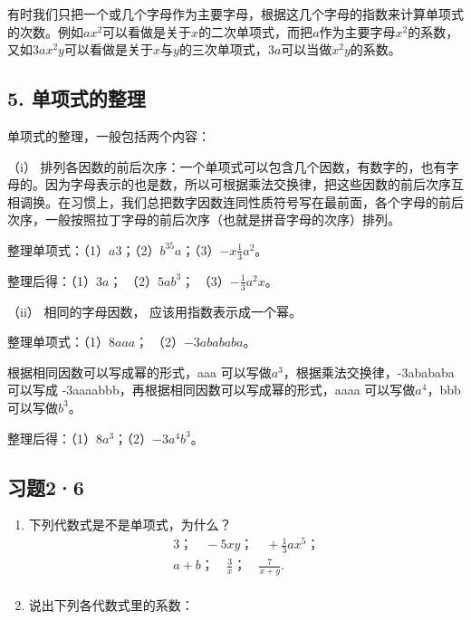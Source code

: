 
有时我们只把一个或几个字母作为主要字母，根据这几个字母的指数来计算单项式的次数。例如\(ax^2\)可以看做是关于\(x\)的二次单项式，而把\(a\)作为主要字母\(x^2\)的系数，又如\(3ax^2y\)可以看做是关于\(x\)与\(y\)的三次单项式，\(3a\)可以当做\(x^2y\)的系数。

\subsection{5. 单项式的整理}

单项式的整理，一般包括两个内容：

（i）
排列各因数的前后次序：一个单项式可以包含几个因数，有数字的，也有字母的。因为字母表示的也是数，所以可根据乘法交换律，把这些因数的前后次序互相调换。在习惯上，我们总把数字因数连同性质符号写在最前面，各个字母的前后次序，一般按照拉丁字母的前后次序（也就是拼音字母的次序）排列。

整理单项式：（1）\(a3\)；（2）\(b^35a\)；（3）\(-x\frac{1}{3} a^2\)。

 整理后得：（1）\(3a\)； （2）\(5ab^3\)；
（3）\(-\frac{1}{3} a^2 x\)。

（ii） 相同的字母因数， 应该用指数表示成一个幂。

 整理单项式：（1）\(8aaa\)； （2）\(-3abababa\)。

 根据相同因数可以写成幂的形式，aaa
可以写做\(a^{3}\)，根据乘法交换律，-3abababa 可以写成
-3aaaabbb，再根据相同因数可以写成幂的形式，aaaa 可以写做\(a^{4}\)，bbb
可以写做\(b^{3}\)。

 整理后得：（1）\(8a^{3}\)；（2）\(-3a^{4}b^{3}\)。

\subsection{习题2·6}

\begin{enumerate}
\item
  下列代数式是不是单项式，为什么？
\[
\begin{array}{l} 3\text{；} \quad - 5 x y\text{；} \quad + \frac{1}{3} a x ^{5}\text{；} \\ a + b\text{；} \quad \frac{3}{x}\text{；} \quad \frac{7}{x + y}. \\ \end{array}
\]
\item
  说出下列各代数式里的系数：
\end{enumerate}

